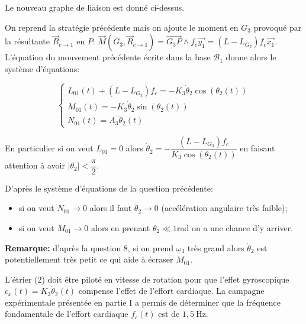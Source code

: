 \begin{corrige}
Le nouveau graphe de liaison est donné ci-dessus.

On reprend la stratégie précédente mais on ajoute le moment en $G_3$ provoqué par la résultante $\overrightarrow{R}_{c \to 1}$ en $P$: $\overrightarrow{M}\left(G_3,\overrightarrow{R}_{c \to 1}\right) = \overrightarrow{G_3 P} \wedge f_c\overrightarrow{y_1} = (L - L_{G_3})f_c \overrightarrow{x_1}$. L'équation du mouvement précédente écrite dans la base $\mathcal{B}_1$ donne alors le système d'équations:

$$
\left\{
\begin{array}{ll}
L_{01}(t) + (L - L_{G_3})f_c = - K_3\dot{\theta}_2 \cos(\theta_2(t)) \\
M_{01}(t) = - K_3\dot{\theta}_2 \sin(\theta_2(t)) \\
N_{01}(t) = A_3 \ddot{\theta}_2(t)
\end{array}
\right.
$$

En particulier si on veut $L_{01} = 0$ alors $\boxed{\dot{\theta}_2 = - \dfrac{(L - L_{G_3})f_c}{K_3\cos(\theta_2(t))}}$ en faisant attention à avoir $|\theta_2| < \dfrac{\pi}{2}$.
 

\end{corrige}
\else
\fi

\ifprof
\begin{corrige}
D'après le système d'équations de la question précédente:
\begin{itemize}
\item si on veut $N_{01} \to 0$ alors il faut $\ddot{\theta}_2 \to 0$ (accélération angulaire très faible);
\item si on veut $M_{01} \to 0$ alors en prenant $\theta_2 \ll 1$rad on a une chance d'y arriver.
\end{itemize} 

\textbf{Remarque:} d'après la question 8, si on prend $\omega_3$ très grand alors $\dot{\theta}_2$ est potentiellement très petit ce qui aide à \og écraser \fg{} $M_{01}$.
\end{corrige}
\else
\fi

\ifprof
\else
L'étrier (2) doit être piloté en vitesse de rotation pour que l'effet gyroscopique $c_{x}(t)=K_{3} \dot{\theta}_{2}(t)$ compense l'effet de l'effort cardiaque. La campagne expérimentale présentée en partie I a permis de déterminer que la fréquence fondamentale de l'effort cardiaque $f_{c}(t)$ est de $1,5 \mathrm{~Hz}$.

